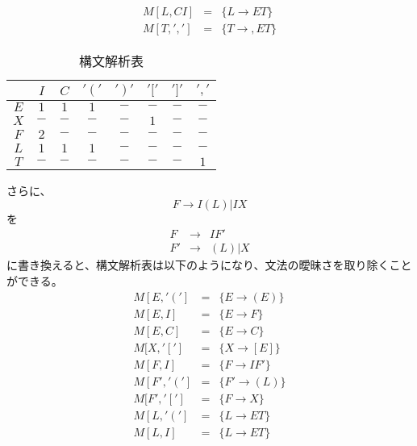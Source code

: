 \documentclass[a4paper,12pt]{jarticle}
\begin{document}
\begin{enumerate}
\begin{eqnarray*}
M [ L ,CI ] & = & \{ L \rightarrow E T \} \\
M [ T , ' , ' ] & = & \{ T \rightarrow , E T \}
\end{eqnarray*}
\begin{table}[H]
 \begin{center}
  \caption{構文解析表}
  \begin{tabular}{|c|ccccccc|}\hline
   \backslashbox{}{}&	$ I $&	$ C $&	$' \left( \right. '$&	$' \left. \right) '$&	$ ' [ ' $&	$ ' ] ' $&	$ ' , ' $\\	\hline
   $ E $&		$ 1 $&	$ 1 $&	$ 1 $&			$ - $&			$ - $&		$ - $&		$ - $\\
   $ X $&		$ - $&	$ - $&	$ - $&			$ - $&			$ 1 $&		$ - $&		$ - $\\
   $ F $&		$ 2 $&	$ - $&	$ - $&			$ - $&			$ - $&		$ - $&		$ - $\\
   $ L $&		$ 1 $&	$ 1 $&	$ 1 $&			$ - $&			$ - $&		$ - $&		$ - $\\
   $ T $&		$ - $&	$ - $&	$ - $&			$ - $&			$ - $&		$ - $&		$ 1 $\\		\hline
  \end{tabular}
 \end{center}
\end{table}
さらに、
\begin{equation}
F \rightarrow I \left( L \right) | I X
\end{equation}
を
\begin{eqnarray*}
F & \rightarrow & I F' \\
F' & \rightarrow & \left( L \right) | X
\end{eqnarray*}
に書き換えると、構文解析表は以下のようになり、文法の曖昧さを取り除くことができる。
\begin{eqnarray*}
M [ E , ' \left( \right. ' ] & = & \{ E \rightarrow \left( E \right) \} \\
M [ E , I ] & = & \{ E \rightarrow F \} \\
M [ E , C ] & = & \{ E \rightarrow C \} \\
M [ X , ' [ ' ] & = & \{ X \rightarrow [ E ] \} \\
M [ F , I ] & = & \{ F \rightarrow I F' \} \\
M [ F' , ' \left( \right. ' ] & = & \{ F' \rightarrow \left( L \right) \} \\
M [ F' , ' [ ' ] & = & \{ F \rightarrow X \} \\
M [ L , ' \left( \right. ' ] & = & \{ L \rightarrow E T \} \\
M [ L , I ] & = & \{ L \rightarrow E T \} \\

\end{eqnarray*}
\end{enumerate}
\end{document}
